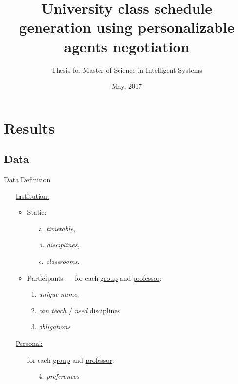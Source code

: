 \documentclass{beamer}
\title{University class schedule generation using personalizable agents negotiation}
\subtitle{Thesis for Master of Science in Intelligent Systems}
\institute[ITESM]{Tecnol\'{o}gico de Monterrey}
\date{May, 2017}
\begin{document}
\frame{\titlepage}

% 
% 
% 
% 
% 
% 


\section{Results}
\subsection{Data}

\begin{frame}{Data Definition}
  \begin{mdframed}[leftmargin=1cm, hidealllines=true]
    \begin{itemize}
      \item[\underline{Institution:}]
        \begin{itemize}
          \item Static:
                \begin{enumerate}
                  \item[a.] \emph{timetable},
                  \item[b.] \emph{disciplines},
                  \item[c.] \emph{classrooms}.
                \end{enumerate}
          \item Participants --- for each \underline{group} and \underline{professor}:\\
                \begin{enumerate}
                  \item \emph{unique name},
                  \item \emph{can teach} / \emph{need} disciplines
                  \item \emph{obligations}
                \end{enumerate}
        \end{itemize}
      \item[\underline{Personal:}]
        \begin{itemize}
          \item[] for each \underline{group} and \underline{professor}:
          \begin{enumerate}
            \item[4.] \emph{preferences}
          \end{enumerate}
        \end{itemize}
    \end{itemize}
  \end{mdframed}
\end{frame}
\end{document}
